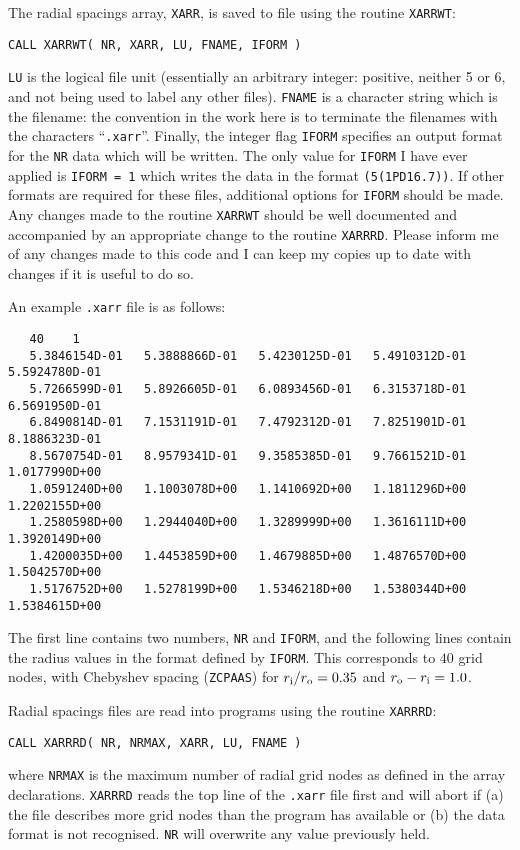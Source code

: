 The radial spacings array, \verb.XARR., is saved to file
using the routine \verb+XARRWT+:
\begin{verbatim}
CALL XARRWT( NR, XARR, LU, FNAME, IFORM )
\end{verbatim}
\verb.LU. is the logical file unit (essentially an arbitrary
integer: positive, neither 5 or 6, and not being used to
label any other files). \verb.FNAME. is a character string
which is the filename: the convention in the work here is
to terminate the filenames with the characters
``\verb+.xarr+''.
Finally, the integer flag \verb.IFORM. specifies an 
output format for the \verb+NR+ data which will be
written. The only value for \verb.IFORM. I have ever
applied is \verb.IFORM = 1. which writes the data in
the format \verb+(5(1PD16.7))+.
If other formats are required for these files,
additional options for \verb.IFORM. should be made.
Any changes made to the routine \verb.XARRWT. should
be well documented and accompanied by an appropriate
change to the routine \verb.XARRRD..
Please inform me of any changes made to this code
and I can keep my copies up to date with changes
if it is useful to do so.

An example \verb+.xarr+ file is as follows:
\begin{scriptsize}
\begin{verbatim}
   40    1
   5.3846154D-01   5.3888866D-01   5.4230125D-01   5.4910312D-01   5.5924780D-01
   5.7266599D-01   5.8926605D-01   6.0893456D-01   6.3153718D-01   6.5691950D-01
   6.8490814D-01   7.1531191D-01   7.4792312D-01   7.8251901D-01   8.1886323D-01
   8.5670754D-01   8.9579341D-01   9.3585385D-01   9.7661521D-01   1.0177990D+00
   1.0591240D+00   1.1003078D+00   1.1410692D+00   1.1811296D+00   1.2202155D+00
   1.2580598D+00   1.2944040D+00   1.3289999D+00   1.3616111D+00   1.3920149D+00
   1.4200035D+00   1.4453859D+00   1.4679885D+00   1.4876570D+00   1.5042570D+00
   1.5176752D+00   1.5278199D+00   1.5346218D+00   1.5380344D+00   1.5384615D+00
\end{verbatim}
\end{scriptsize}
The first line contains two numbers, \verb.NR. and 
\verb.IFORM., and the following lines contain the radius values
in the format defined by \verb.IFORM..
This corresponds to $40$ grid nodes, with Chebyshev spacing
(\verb.ZCPAAS.) for $r_{\rm i}/r_{\rm o} = 0.35$ and
$r_{\rm o} - r_{\rm i} = 1.0$.

Radial spacings files are read into programs
using the routine \verb+XARRRD+:
\begin{verbatim}
CALL XARRRD( NR, NRMAX, XARR, LU, FNAME )
\end{verbatim}
where \verb.NRMAX. is the maximum number of
radial grid nodes as defined in the array declarations.
\verb+XARRRD+ reads the top line of the \verb+.xarr+ file
first and will abort if (a) the file describes more grid
nodes than the program has available or (b) the data
format is not recognised. \verb+NR+ will overwrite any
value previously held.

